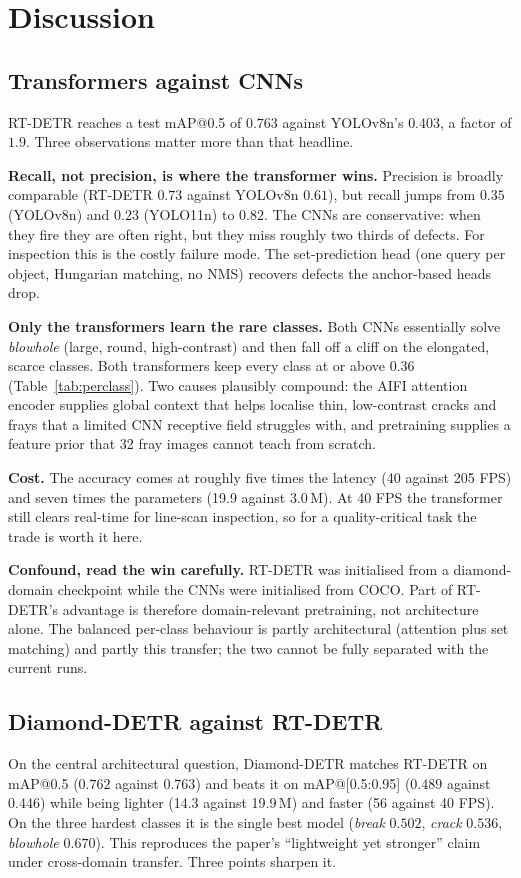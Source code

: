 \documentclass[11pt,a4paper]{article}
\begin{document}
\section{Discussion}
\subsection{Transformers against CNNs}
RT-DETR reaches a test mAP@0.5 of $0.763$ against YOLOv8n's $0.403$, a factor of $1.9$. Three
observations matter more than that headline.

\textbf{Recall, not precision, is where the transformer wins.} Precision is broadly comparable
(RT-DETR $0.73$ against YOLOv8n $0.61$), but recall jumps from $0.35$ (YOLOv8n) and $0.23$
(YOLO11n) to $0.82$. The CNNs are conservative: when they fire they are often right, but they miss
roughly two thirds of defects. For inspection this is the costly failure mode. The set-prediction
head (one query per object, Hungarian matching, no NMS) recovers defects the anchor-based heads
drop.

\textbf{Only the transformers learn the rare classes.} Both CNNs essentially solve \emph{blowhole}
(large, round, high-contrast) and then fall off a cliff on the elongated, scarce classes. Both
transformers keep every class at or above $0.36$ (Table~\ref{tab:perclass}). Two causes plausibly
compound: the AIFI attention encoder supplies global context that helps localise thin, low-contrast
cracks and frays that a limited CNN receptive field struggles with, and pretraining supplies a
feature prior that 32 fray images cannot teach from scratch.

\textbf{Cost.} The accuracy comes at roughly five times the latency (40 against 205 FPS) and seven
times the parameters (19.9 against 3.0\,M). At 40 FPS the transformer still clears real-time for
line-scan inspection, so for a quality-critical task the trade is worth it here.

\textbf{Confound, read the win carefully.} RT-DETR was initialised from a diamond-domain checkpoint
while the CNNs were initialised from COCO. Part of RT-DETR's advantage is therefore domain-relevant
pretraining, not architecture alone. The balanced per-class behaviour is partly architectural
(attention plus set matching) and partly this transfer; the two cannot be fully separated with the
current runs.

\subsection{Diamond-DETR against RT-DETR}
On the central architectural question, Diamond-DETR matches RT-DETR on mAP@0.5 ($0.762$ against
$0.763$) and beats it on mAP@[0.5:0.95] ($0.489$ against $0.446$) while being lighter (14.3 against
19.9\,M) and faster (56 against 40 FPS). On the three hardest classes it is the single best model
(\emph{break} $0.502$, \emph{crack} $0.536$, \emph{blowhole} $0.670$). This reproduces the paper's
``lightweight yet stronger'' claim under cross-domain transfer. Three points sharpen it.
\end{document}
